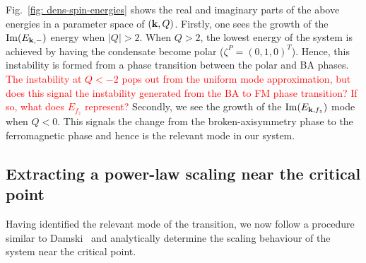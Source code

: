 Fig.~\ref{fig: dens-spin-energies} shows the real and imaginary parts of the
above energies in a parameter space of $(\vb{k}, Q)$.
Firstly, one sees the growth of the $\mathrm{Im}(E_{\vb{k}, -})$ energy
when $|Q| > 2$.
When $Q>2$, the lowest energy of the system is achieved by having the condensate
become polar ($\zeta^P=(0,1,0)^T$).
Hence, this instability is formed from a phase transition between the polar
and BA phases.
\textcolor{red}{The instability at $Q < -2$ pops out from the uniform mode
approximation, but does this signal the instability generated from the BA
to FM phase transition? If so, what does $E_{f_{z}}$ represent?}
Secondly, we see the growth of the $\mathrm{Im}(E_{\vb{k}, {f_z}})$ mode when
$Q<0$.
This signals the change from the broken-axisymmetry phase to the ferromagnetic
phase and hence is the relevant mode in our system.

\subsection{Extracting a power-law scaling near the critical point}
Having identified the relevant mode of the transition, we now follow a procedure
similar to Damski~\cite{Damski2007} and analytically determine the scaling
behaviour of the system near the critical point.

